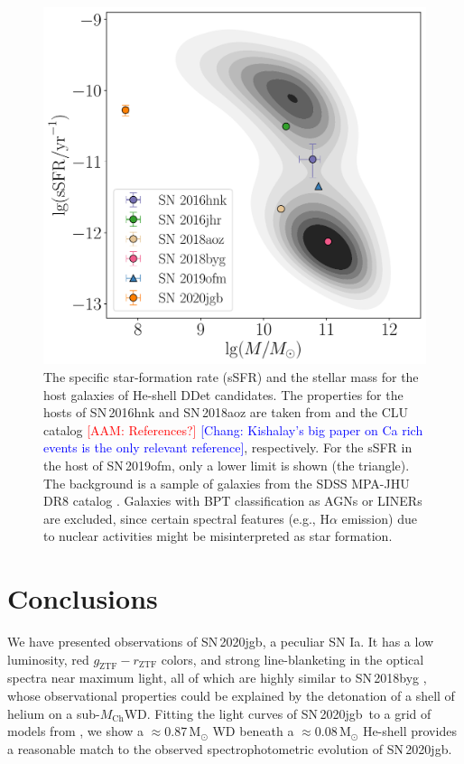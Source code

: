 \documentclass[twocolumn]{aastex631}
\newcommand{\sn}{SN\,2020jgb}
\newcommand{\Mch}{$M_\mathrm{Ch}$}
\newcommand{\adam}[1]{\textcolor{red}{[AAM: #1]}}
\newcommand{\chang}[1]{\textcolor{blue}{[Chang: #1]}}
\begin{document}
\begin{figure}
    \centering
    \includegraphics[width=\linewidth]{host.pdf}
    \caption{The specific star-formation rate (sSFR) and the stellar mass for the host galaxies of He-shell DDet candidates. The properties for the hosts of SN\,2016hnk and SN\,2018aoz are taken from \citet{Dong_Ca-rich_2022} and the CLU catalog \adam{References?} \chang{Kishalay's big paper on Ca rich events is the only relevant reference}, respectively. For the sSFR in the host of SN\,2019ofm, only a lower limit is shown (the triangle). The background is a sample of galaxies from the SDSS MPA-JHU DR8 catalog \citep{Kauffmann_SDSS_2003,Brinchmann_SDSS_2004}. Galaxies with BPT classification as AGNs or LINERs are excluded, since certain spectral features (e.g., H$\alpha$ emission) due to nuclear activities might be misinterpreted as star formation.}
    \label{fig:host}
\end{figure}

\section{Conclusions} \label{sec:conclusion}
We have presented observations of \sn, a peculiar SN Ia. It has a low luminosity, red $g_\mathrm{ZTF}-r_\mathrm{ZTF}$ colors, and strong line-blanketing in the optical spectra near maximum light, all of which are highly similar to SN\,2018byg \citep{de_18byg_2019}, whose observational properties could be explained by the detonation of a shell of helium on a sub-\Mch WD. Fitting the light curves of \sn\ to a grid of models from \citet{polin_observational_2019}, we show a $\approx$0.87\,$\mathrm{M_\odot}$ WD beneath a $\approx$0.08\,$\mathrm{M_\odot}$ He-shell provides a reasonable match to the observed spectrophotometric evolution of \sn.
\end{document}
